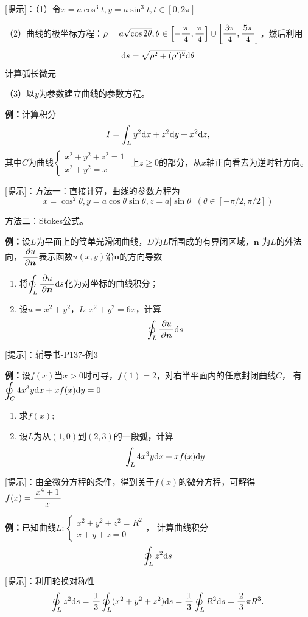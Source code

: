 [提示]：（1）令$x=a\cos^3t,y=a\sin^3t,t\in[0,2\pi]$

（2）曲线的极坐标方程：$\rho=a\sqrt{\cos2\theta},\theta\in\left[-\displaystyle\frac{\,{\pi}\,}{\,{4}\,},
\displaystyle\frac{\,{\pi}\,}{\,{4}\,}\right]\cup\left[\displaystyle\frac{\,{3\pi}\,}{\,{4}\,},\displaystyle\frac{\,{5\pi}\,}{\,{4}\,}\right]$，然后利用
$$\mathrm{d} s=\sqrt{\rho^2+(\rho')^2}\mathrm{d}\theta$$
计算弧长微元

（3）以$y$为参数建立曲线的参数方程。

{\bf 例：}计算积分
$$I=\int_Ly^2\mathrm{d} x+z^2\mathrm{d} y+x^2\mathrm{d} z,$$
其中$C$为曲线$\left\{\begin{array}{l}
x^2+y^2+z^2=1 \\ x^2+y^2=x
\end{array}\right.$
上$z\geq 0$的部分，从$x$轴正向看去为逆时针方向。

[提示]：方法一：直接计算，曲线的参数方程为 
$$x=\cos^2\theta,y=a\cos\theta\sin\theta, z=a|\sin\theta|\;
(\theta\in[-\pi/2,\pi/2])$$

方法二：Stokes公式。

{\bf 例：}设$L$为平面上的简单光滑闭曲线，$D$为$L$所围成的有界闭区域，$\bm{n}$
为$L$的外法向，$\displaystyle\frac{\,{\partial u}\,}{\,{\partial\bm{n}}\,}$表示函数$u(x,y)$沿$\bm{n}$的方向导数
\begin{enumerate}[(1)]
  \setlength{\itemindent}{1cm}
  \item 将$\displaystyle\oint_L\displaystyle\frac{\,{\partial u}\,}{\,{\partial\bm{n}}\,}\mathrm{d} s$化为对坐标的曲线积分；
  \item 设$u=x^2+y^2$，$L:x^2+y^2=6x$，计算
  $$\displaystyle\oint_L\displaystyle\frac{\,{\partial u}\,}{\,{\partial\bm{n}}\,}\mathrm{d} s$$
\end{enumerate}

[提示]：辅导书-P137-例3

{\bf 例：}设$f(x)$当$x>0$时可导，$f(1)=2$，对右半平面内的任意封闭曲线$C$，
有$\displaystyle\oint_C4x^3y\mathrm{d} x+xf(x)\mathrm{d} y=0$
\begin{enumerate}[(1)]
  \setlength{\itemindent}{1cm}
  \item 求$f(x)$;
  \item 设$L$为从$(1,0)$到$(2,3)$的一段弧，计算
  $$\displaystyle\int_L4x^3y\mathrm{d} x+xf(x)\mathrm{d} y$$
\end{enumerate}

[提示]：由全微分方程的条件，得到关于$f(x)$的微分方程，可解得$f(x)=\displaystyle\frac{\,{x^4+1}\,}{\,{x}\,}$

{\bf 例：}已知曲线$L:\left\{\begin{array}{l}
	x^2+y^2+z^2=R^2\\ x+y+z=0
\end{array}\right.$，
计算曲线积分
$$\oint_Lz^2\mathrm{d} s$$

[提示]：利用轮换对称性
$$\oint_Lz^2\mathrm{d} s=\displaystyle\frac{\,{1}\,}{\,{3}\,}\oint_L(x^2+y^2+z^2)\mathrm{d} s
=\displaystyle\frac{\,{1}\,}{\,{3}\,}\oint_LR^2\mathrm{d} s=\displaystyle\frac{\,{2}\,}{\,{3}\,}\pi R^3.$$

